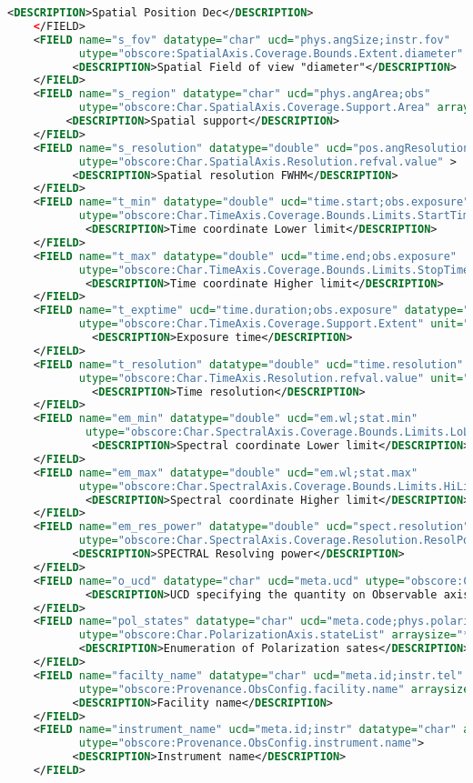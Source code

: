 \documentclass[11pt,a4paper]{ivoa}
\begin{document}
\begin{lstlisting}[basicstyle=\scriptsize,language=XML]
        <DESCRIPTION>Spatial Position Dec</DESCRIPTION>
    </FIELD>
    <FIELD name="s_fov" datatype="char" ucd="phys.angSize;instr.fov"
           utype="obscore:SpatialAxis.Coverage.Bounds.Extent.diameter" unit="deg" >
          <DESCRIPTION>Spatial Field of view "diameter"</DESCRIPTION>
    </FIELD>
    <FIELD name="s_region" datatype="char" ucd="phys.angArea;obs"
           utype="obscore:Char.SpatialAxis.Coverage.Support.Area" arraysize="*" unit="deg" >
         <DESCRIPTION>Spatial support</DESCRIPTION>
    </FIELD>
    <FIELD name="s_resolution" datatype="double" ucd="pos.angResolution"
           utype="obscore:Char.SpatialAxis.Resolution.refval.value" >
          <DESCRIPTION>Spatial resolution FWHM</DESCRIPTION>
    </FIELD>
    <FIELD name="t_min" datatype="double" ucd="time.start;obs.exposure"
           utype="obscore:Char.TimeAxis.Coverage.Bounds.Limits.StartTime" unit="s" >
            <DESCRIPTION>Time coordinate Lower limit</DESCRIPTION>
    </FIELD>
    <FIELD name="t_max" datatype="double" ucd="time.end;obs.exposure"
           utype="obscore:Char.TimeAxis.Coverage.Bounds.Limits.StopTime" unit="s">
            <DESCRIPTION>Time coordinate Higher limit</DESCRIPTION>
    </FIELD>
    <FIELD name="t_exptime" ucd="time.duration;obs.exposure" datatype="double"
           utype="obscore:Char.TimeAxis.Coverage.Support.Extent" unit="s" >
             <DESCRIPTION>Exposure time</DESCRIPTION>
    </FIELD>
    <FIELD name="t_resolution" datatype="double" ucd="time.resolution"
           utype="obscore:Char.TimeAxis.Resolution.refval.value" unit="s" >
             <DESCRIPTION>Time resolution</DESCRIPTION>
    </FIELD>
    <FIELD name="em_min" datatype="double" ucd="em.wl;stat.min"
            utype="obscore:Char.SpectralAxis.Coverage.Bounds.Limits.LoLimit" unit="m" >
             <DESCRIPTION>Spectral coordinate Lower limit</DESCRIPTION>
    </FIELD>
    <FIELD name="em_max" datatype="double" ucd="em.wl;stat.max"
           utype="obscore:Char.SpectralAxis.Coverage.Bounds.Limits.HiLimit"  unit="m">
            <DESCRIPTION>Spectral coordinate Higher limit</DESCRIPTION>
    </FIELD>
    <FIELD name="em_res_power" datatype="double" ucd="spect.resolution"
           utype="obscore:Char.SpectralAxis.Coverage.Resolution.ResolPower.refval" >
          <DESCRIPTION>SPECTRAL Resolving power</DESCRIPTION>
    </FIELD>
    <FIELD name="o_ucd" datatype="char" ucd="meta.ucd" utype="obscore:Char.ObservableAxis.ucd" arraysize="*" >
            <DESCRIPTION>UCD specifying the quantity on Observable axis</DESCRIPTION>
    </FIELD>
    <FIELD name="pol_states" datatype="char" ucd="meta.code;phys.polarization"
           utype="obscore:Char.PolarizationAxis.stateList" arraysize="*" >
           <DESCRIPTION>Enumeration of Polarization sates</DESCRIPTION>
    </FIELD>
    <FIELD name="facilty_name" datatype="char" ucd="meta.id;instr.tel"
           utype="obscore:Provenance.ObsConfig.facility.name" arraysize="*">
          <DESCRIPTION>Facility name</DESCRIPTION>
    </FIELD>
    <FIELD name="instrument_name" ucd="meta.id;instr" datatype="char" arraysize="*"
           utype="obscore:Provenance.ObsConfig.instrument.name">
          <DESCRIPTION>Instrument name</DESCRIPTION>
    </FIELD>


\end{lstlisting}
\end{document}
